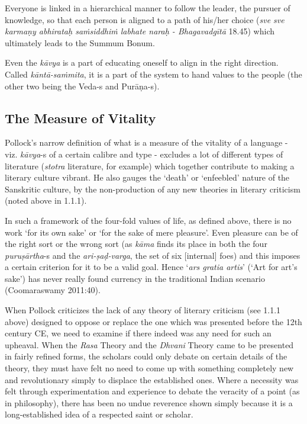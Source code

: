 Everyone is linked in a hierarchical manner to follow the leader, the pursuer of knowledge, so that each person is aligned to a path of his/her choice ({\sl sve sve karmaṇy abhirataḥ saṁsiddhiṁ labhate naraḥ - Bhagavadgītā} 18.45) which ultimately leads to the Summum Bonum. 

Even the {\sl kāvya} is a part of educating oneself to align in the right direction. Called {\sl kāntā-saṁmita}, it is a part of the system to hand values to the people (the other two being the Veda-s and Purāṇa-s).
\vskip -40pt

\subsection{The Measure of Vitality}
\vskip -5pt

Pollock’s narrow definition of what is a measure of the vitality of a language - viz. {\sl kāvya}-s of a certain calibre and type - excludes a lot of different types of literature ({\sl stotra} literature, for example) which together contribute to making a literary culture vibrant. He also gauges the ‘death’ or ‘enfeebled’ nature of the Sanskritic culture,  by the non-production of any new theories in literary criticism (noted above in 1.1.1).

In such a framework of the four-fold values of life, as defined above, there is no work ‘for its own sake’ or ‘for the sake of mere pleasure’. Even pleasure can be of the right sort or the wrong sort (as {\sl kāma} finds its place in both the four {\sl puruṣārtha}-s and the {\sl ari-ṣaḍ-varga}, the set of six [internal] foes) and this imposes a certain criterion for it to be a valid goal. Hence ‘{\sl ars gratia artis}’ (‘Art for art’s sake’) has never really found currency in the traditional Indian scenario (Coomaraswamy 2011:40). 

When Pollock criticizes the lack of any theory of literary criticism (see 1.1.1 above) designed to oppose or replace the one which was presented before the 12th century CE, we need to examine if there indeed was any need for such an upheaval. When the {\sl Rasa} Theory and the {\sl Dhvani} Theory came to be presented in fairly refined forms, the scholars could only debate on certain details of the theory, they must have felt no need to come up with something completely new and revolutionary simply to displace the established ones. Where a necessity was felt through experimentation and experience to debate the veracity of a point (as in philosophy), there has been no undue reverence shown simply because it is a long-established idea of a respected saint or scholar.

